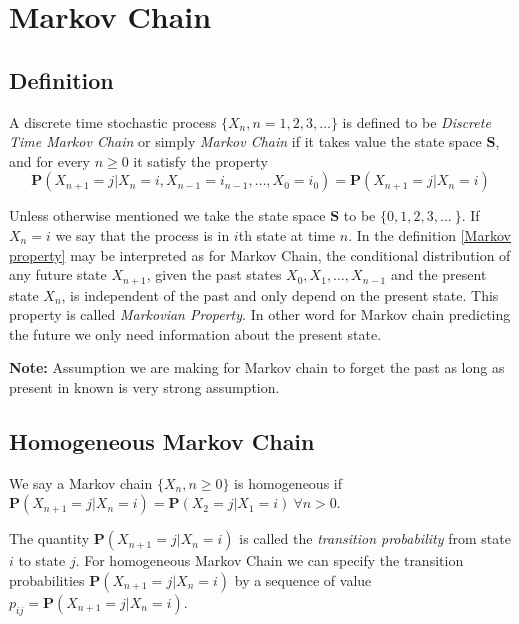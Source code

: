 \chapter{Markov Chain}

\section{Definition}

\begin{definition}
    A discrete time stochastic process $\{X_n,n=1,2,3,\ldots\}$ is defined to be \textit{Discrete Time Markov Chain} or simply \textit{Markov Chain}
    if it takes value  the state space $ \mathbf{S} $, and for every
    $n\ge 0$ it satisfy the property
    \begin{equation}
        \label{Markov property}
         \mathbf{P}( X_{n+1} = j | X_n =i , X_{n-1} = i_{n-1}, \ldots, X_0 = i_0 ) = \mathbf{P}( X_{n+1} = j | X_n =i )
    \end{equation}
\end{definition}

Unless otherwise mentioned we take the state space $ \mathbf{S} $ to be $\{0, 1, 2, 3, \ldots\ \} $. 
If $X_n = i $ we say that the process is in $i $th state at time $n$.
In the definition \cref{Markov property} may be interpreted as for Markov Chain, the conditional distribution of any future state $ X_{n+1} $, given the past states  $ X_0, X_1,\ldots, X_{n-1} $  and the present state $ X_n $, is independent of the past and only depend on the present state.
This property is called \textit{Markovian Property}. In other word for Markov chain predicting the future we only need information about the present state.

\textbf{Note:} Assumption we are making for Markov chain to forget the past as long as present in known is very strong assumption.

\section{Homogeneous Markov Chain}

\begin{definition}
    We say a Markov chain $ \{ X_n,n\ge 0 \} $ is homogeneous if $ \mathbf{P}(X_{n+1}=j|X_n=i)=\mathbf{P}(X_2=j|X_1=i) \ \forall n>0 $. 
\end{definition}

The quantity $ \mathbf{P}(X_{n+1}=j|X_n=i) $ is called the \textit{transition probability} from state $i$ to state $j$. For homogeneous Markov Chain 
we can specify the transition probabilities $ \mathbf{P}(X_{n+1}=j|X_{n}=i) $ by a sequence of value $ p_{ij} = \mathbf{P}(X_{n+1}=j|X_{n}=i) $.

